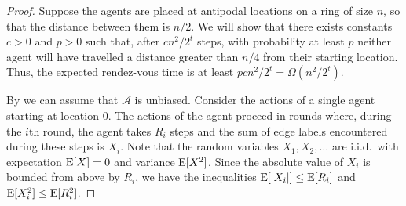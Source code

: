 \documentclass{patmorin}
\newcommand{\A}{\mathcal{A}}
\begin{document}
\begin{proof}
Suppose the agents are placed at antipodal locations on a ring of size
$n$,
so that the distance between them is $n/2$.  We will show that there
exists constants $c >0$ and $p> 0$ such that, after $cn^2/2^t$ steps,
with probability at least $p$ neither agent will have travelled a
distance greater than $n/4$ from their starting location.  Thus, the
expected rendez-vous time is at least $p cn^2/2^t = \Omega(n^2/2^t)$.

By  we can assume that $\A$ is unbiased.
Consider the actions of a single agent starting at location 0.  The
actions of the agent proceed in rounds where, during the $i$th round,
the agent takes $R_i$ steps and the sum of edge labels encountered
during these steps is $X_i$.  Note that the random variables
$X_1,X_2,\ldots$ are i.i.d.\ with expectation $\mathrm{E}[X]=0$ and variance
$\mathrm{E}[X^2]$. Since the absolute value of $X_i$ is bounded from above by
$R_i$, we have the inequalities $\mathrm{E}[|X_i|]\le \mathrm{E}[R_i]$ and
$\mathrm{E}[X_i^2]\le\mathrm{E}[R_i^2]$. 


\end{proof}
\end{document}
